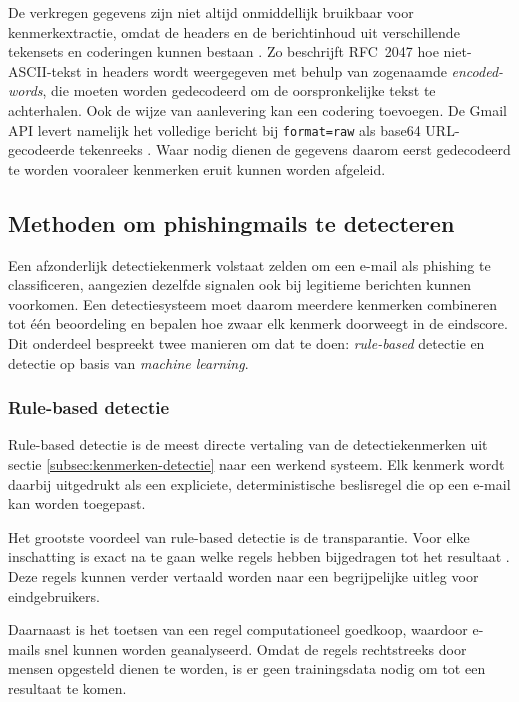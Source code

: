 De verkregen gegevens zijn niet altijd onmiddellijk bruikbaar voor kenmerkextractie, omdat de headers en de berichtinhoud uit verschillende tekensets en coderingen kunnen bestaan \autocite{Koide2025}. Zo beschrijft RFC~2047 \autocite{Moore1996} hoe niet-ASCII-tekst in headers wordt weergegeven met behulp van zogenaamde \emph{encoded-words}, die moeten worden gedecodeerd om de oorspronkelijke tekst te achterhalen. Ook de wijze van aanlevering kan een codering toevoegen. De Gmail API levert namelijk het volledige bericht bij \texttt{format=raw} als base64 URL-gecodeerde tekenreeks . Waar nodig dienen de gegevens daarom eerst gedecodeerd te worden vooraleer kenmerken eruit kunnen worden afgeleid.

\subsection{Methoden om phishingmails te detecteren}
\label{subsec:methoden-detectie}

Een afzonderlijk detectiekenmerk volstaat zelden om een e-mail als phishing te classificeren, aangezien dezelfde signalen ook bij legitieme berichten kunnen voorkomen. Een detectiesysteem moet daarom meerdere kenmerken combineren tot één beoordeling en bepalen hoe zwaar elk kenmerk doorweegt in de eindscore. Dit onderdeel bespreekt twee manieren om dat te doen: \emph{rule-based} detectie en detectie op basis van \emph{machine learning}.

\subsubsection{Rule-based detectie}
\label{subsubsec:rulebased-detectie}

Rule-based detectie is de meest directe vertaling van de detectiekenmerken uit sectie \ref{subsec:kenmerken-detectie} naar een werkend systeem. Elk kenmerk wordt daarbij uitgedrukt als een expliciete, deterministische beslisregel die op een e-mail kan worden toegepast.

Het grootste voordeel van rule-based detectie is de transparantie. Voor elke inschatting is exact na te gaan welke regels hebben bijgedragen tot het resultaat \autocite{Rudin2019}. Deze regels kunnen verder vertaald worden naar een begrijpelijke uitleg voor eindgebruikers.

Daarnaast is het toetsen van een regel computationeel goedkoop, waardoor e-mails snel kunnen worden geanalyseerd. Omdat de regels rechtstreeks door mensen opgesteld dienen te worden, is er geen trainingsdata nodig om tot een resultaat te komen.

